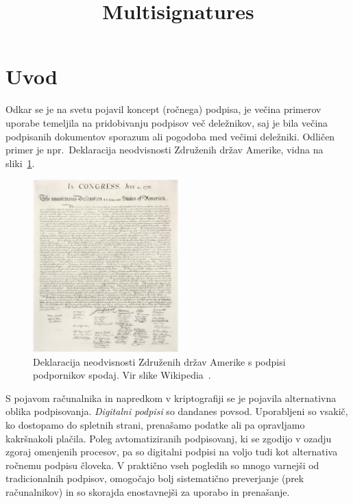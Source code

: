 \documentclass[isrm2, tisk]{fmfdelo}
\title{Multisignatures}
\begin{document}
\section{Uvod}
Odkar se je na svetu pojavil koncept (ročnega) podpisa, je večina primerov uporabe temeljila na
pridobivanju podpisov več deležnikov, saj je bila večina podpisanih dokumentov sporazum ali pogodoba
med večimi deležniki. Odličen primer je npr.\ Deklaracija neodvisnosti Združenih držav
Amerike, vidna na sliki~\ref{fig:declaration}. 

\begin{figure}[ht]
  \centering
  \includegraphics[width=0.5\textwidth]{images/declaration.jpg}
  \caption[Deklaracija neodvisnosti Združenih držav Amerike.]{Deklaracija neodvisnosti Združenih 
  držav Amerike s podpisi podpornikov spodaj. Vir slike Wikipedia~\cite{doi}.}
  \label{fig:declaration}
\end{figure}

S pojavom računalnika in napredkom v kriptografiji se je pojavila alternativna oblika podpisovanja.
\textit{Digitalni podpisi} so dandanes povsod. Uporabljeni so vsakič, ko dostopamo do spletnih
strani, prenašamo podatke ali pa opravljamo kakršnakoli plačila. Poleg avtomatiziranih podpisovanj,
ki se zgodijo v ozadju zgoraj omenjenih procesov, pa so digitalni podpisi na voljo tudi kot alternativa
ročnemu podpisu človeka. V praktično vseh pogledih so mnogo varnejši od tradicionalnih podpisov,
omogočajo bolj sistematično preverjanje (prek računalnikov) in so skorajda enostavnejši za uporabo
in prenašanje.
\end{document}
